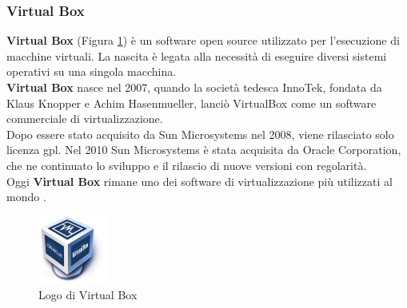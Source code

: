 \subsubsection{Virtual Box}
\textbf{Virtual Box} (Figura \ref{fig:virtual_box}) è un software \gls{open source}{} utilizzato per l'esecuzione di macchine 
virtuali. La nascita è legata alla necessità di eseguire diversi sistemi operativi su una singola macchina.\\
\textbf{Virtual Box} nasce nel 2007, quando la società tedesca InnoTek, fondata da Klaus Knopper e Achim Hasenmueller, lanciò VirtualBox come un software commerciale di virtualizzazione.\\    
Dopo essere stato acquisito da Sun Microsystems nel 2008, viene rilasciato solo licenza \gls{gpl}{}.
Nel 2010 Sun Microsystems è stata acquisita da Oracle Corporation, che ne continuato lo sviluppo e il rilascio di nuove versioni con regolarità.\\
Oggi \textbf{Virtual Box} rimane uno dei software di virtualizzazione più utilizzati al mondo \cite{site:Intro_virtual_Box}.
\begin{figure}[h]
    \centering
    \includegraphics[width=0.2\textwidth]{images/tecnologie/logo_virtualbox.png}
    \caption{Logo di Virtual Box}
    \label{fig:virtual_box}
\end{figure}
